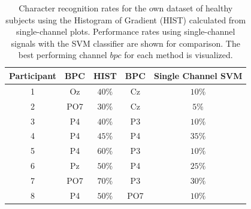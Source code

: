 \documentclass[utf8]{frontiersSCNS} %
\begin{document}

\begin{table}[htb]
\caption{Character recognition rates for the own dataset of healthy subjects using the Histogram of Gradient (HIST) calculated from  single-channel plots.  Performance rates using single-channel signals with the SVM classifier are shown for comparison.  The best performing channel $bpc$ for each method is visualized.}
\centering
\begin{tabular}{c|cc|cc}
\toprule
\textbf{Participant}	&  \textbf{BPC}	&  HIST &  \textbf{BPC}	&  Single Channel SVM \\
\midrule
1     &     Oz   &   $40\%$  &  Cz   &  $10\%$    \\
2     &     PO7   &   $30\%$      &  Cz   & $5\%$   \\
3     &     P4   &   $40\%$    &  P3   & $10\%$    \\
4     &     P4 &   $45\%$    &  P4   & $35\%$     \\
5     &     P4 &   $60\%$  &  P3   & $10\%$     \\
6     &     Pz &   $50\%$ &  P4   & $25\%$     \\
7     &     PO7 &   $70\%$  &  P3   & $30\%$     \\
8     &     P4 &   $50\%$    &  PO7   & $10\%$    \\

\end{tabular}
\label{tab:resultsown}
\end{table}
\end{document}
